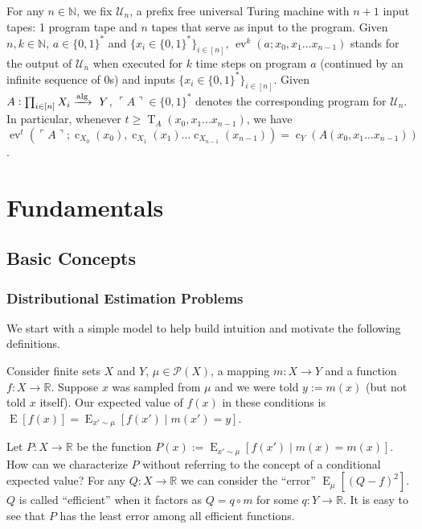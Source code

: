 \documentclass{article}
\numberwithin{equation}{section}
\theoremstyle{definition}
\theoremstyle{plain}
\newcommand{\Bool}{\{0,1\}}
\newcommand{\Words}{{\Bool^*}}
\DeclareMathOperator{\E}{E}
\DeclareMathOperator{\Ev}{ev}
\DeclareMathOperator{\T}{T}
\DeclareMathOperator{\En}{c}
\newcommand{\Nats}{\mathbb{N}}
\newcommand{\Reals}{\mathbb{R}}
\newcommand{\Quote}[1]{\ulcorner #1 \urcorner}
\newcommand{\Alg}{\xrightarrow{\textnormal{alg}}}
\begin{document}
For any $n \in \Nats$, we fix $\mathcal{U}_n$, a prefix free universal Turing machine with $n+1$ input tapes: 1 program tape and $n$ tapes that serve as input to the program. Given ${n,k \in \Nats}$, ${a \in \Words}$ and ${\{x_i \in \Words\}_{i \in [n]}}$, ${\Ev^k(a;x_0,x_1 \ldots x_{n-1})}$ stands for the output of ${\mathcal{U}_n}$ when executed for ${k}$ time steps on program ${a}$ (continued by an infinite sequence of 0s) and inputs ${\{x_i \in \Words\}_{i \in [n]}}$. Given $A: \prod_{i \in [n]} X_i \Alg\ Y$, $\Quote{A} \in \Words$ denotes the corresponding program for $\mathcal{U}_n$. In particular, whenever ${t \geq \T_A(x_0,x_1 \ldots x_{n-1})}$, we have ${\Ev^t(\Quote{A};\En_{X_0}(x_0),\En_{X_1}(x_1) \ldots \En_{X_{n-1}}(x_{n-1}))=\En_Y(A(x_0,x_1 \ldots x_{n-1}))}$.

\section{Fundamentals}
\label{sec:fundamentals}

\subsection{Basic Concepts}

\subsubsection{Distributional Estimation Problems}

We start with a simple model to help build intuition and motivate the following definitions.

Consider finite sets $X$ and $Y$, $\mu \in \mathcal{P}(X)$, a mapping $m: X \rightarrow Y$ and a function $f: X \rightarrow \Reals$. Suppose $x$ was sampled from $\mu$ and we were told $y := m(x)$ (but not told $x$ itself). Our expected value of $f(x)$ in these conditions is ${\E[f(x)] = \E_{x' \sim \mu}[f(x') \mid m(x') = y]}$.

Let $P: X \rightarrow \Reals$ be the function $P(x) := \E_{x' \sim \mu}[f(x') \mid m(x) = m(x)]$. How can we characterize $P$ without referring to the concept of a conditional expected value? For any $Q: X \rightarrow \Reals$ we can consider the \enquote{error} $\E_\mu[(Q - f)^2]$. $Q$ is called \enquote{efficient} when it factors as $Q = q \circ m$ for some $q: Y \rightarrow \Reals$. It is easy to see that $P$ has the least error among all efficient functions.
\end{document}
